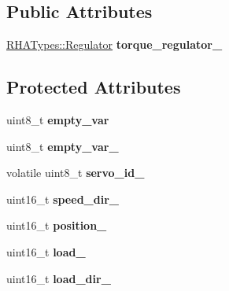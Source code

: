 \subsection*{Public Attributes}
\begin{DoxyCompactItemize}
\item 
\hyperlink{classRHATypes_1_1Regulator}{R\+H\+A\+Types\+::\+Regulator} {\bfseries torque\+\_\+regulator\+\_\+}\hypertarget{classServoRHA_a77b0313984444f5b1f09ff0ecf10f975}{}\label{classServoRHA_a77b0313984444f5b1f09ff0ecf10f975}

\end{DoxyCompactItemize}
\subsection*{Protected Attributes}
\begin{DoxyCompactItemize}
\item 
uint8\+\_\+t {\bfseries empty\+\_\+var}\hypertarget{classServoRHA_a1eb1f55285b79afb966d7d44f64f2aad}{}\label{classServoRHA_a1eb1f55285b79afb966d7d44f64f2aad}

\item 
uint8\+\_\+t {\bfseries empty\+\_\+var\+\_}\hypertarget{classServoRHA_a0e351736018b2bc064d03b51008a0b34}{}\label{classServoRHA_a0e351736018b2bc064d03b51008a0b34}

\item 
volatile uint8\+\_\+t {\bfseries servo\+\_\+id\+\_\+}\hypertarget{classServoRHA_a0a61bbe5f4fd99d39983eb18c7b72823}{}\label{classServoRHA_a0a61bbe5f4fd99d39983eb18c7b72823}

\item 
uint16\+\_\+t {\bfseries speed\+\_\+dir\+\_\+}\hypertarget{classServoRHA_af7c1f52f2b9e8967b9c0b9b65096df48}{}\label{classServoRHA_af7c1f52f2b9e8967b9c0b9b65096df48}

\item 
uint16\+\_\+t {\bfseries position\+\_\+}\hypertarget{classServoRHA_a805b5065a85efc7d94934c0153558c53}{}\label{classServoRHA_a805b5065a85efc7d94934c0153558c53}

\item 
uint16\+\_\+t {\bfseries load\+\_\+}\hypertarget{classServoRHA_ab90b1db8354453f69f9d3c8ba5fb9c8e}{}\label{classServoRHA_ab90b1db8354453f69f9d3c8ba5fb9c8e}

\item 
uint16\+\_\+t {\bfseries load\+\_\+dir\+\_\+}\hypertarget{classServoRHA_a3ffd7c50b36f3dd678541b8750fd6034}{}\label{classServoRHA_a3ffd7c50b36f3dd678541b8750fd6034}


\end{DoxyCompactItemize}
